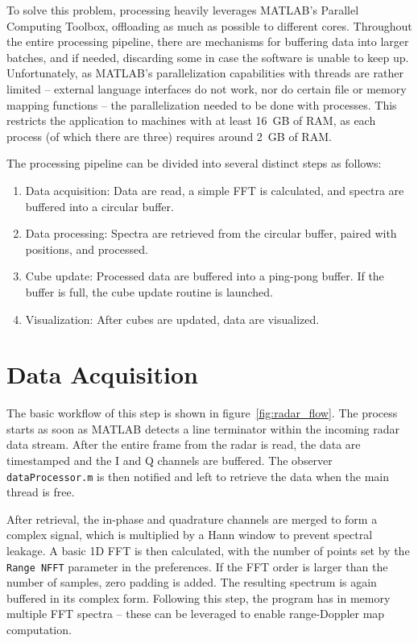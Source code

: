To solve this problem, processing heavily leverages MATLAB's Parallel Computing Toolbox, offloading as much as possible to different cores.
Throughout the entire processing pipeline, there are mechanisms for buffering data into larger batches, and if needed, discarding some in case the software is unable to keep up.
Unfortunately, as MATLAB's parallelization capabilities with threads are rather limited -- external language interfaces do not work, nor do certain file or memory mapping functions \cite{matlabParallel} -- the parallelization needed to be done with processes.
This restricts the application to machines with at least 16~GB of RAM, as each process (of which there are three) requires around 2~GB of RAM.

The processing pipeline can be divided into several distinct steps as follows:
\begin{enumerate}
  \item Data acquisition: Data are read, a simple FFT is calculated, and spectra are buffered into a circular buffer.
  \item Data processing: Spectra are retrieved from the circular buffer, paired with positions, and processed.
  \item Cube update: Processed data are buffered into a ping-pong buffer. If the buffer is full, the cube update routine is launched.
  \item Visualization: After cubes are updated, data are visualized.
\end{enumerate}

\section{Data Acquisition}

The basic workflow of this step is shown in figure~\ref{fig:radar_flow}.
The process starts as soon as MATLAB detects a line terminator within the incoming radar data stream.
After the entire frame from the radar is read, the data are timestamped and the I and Q channels are buffered.
The observer \texttt{dataProcessor.m} is then notified and left to retrieve the data when the main thread is free.

After retrieval, the in-phase and quadrature channels are merged to form a complex signal, which is multiplied by a Hann window to prevent spectral leakage.
A basic 1D FFT is then calculated, with the number of points set by the \texttt{Range NFFT} parameter in the preferences.
If the FFT order is larger than the number of samples, zero padding is added.
The resulting spectrum is again buffered in its complex form.
Following this step, the program has in memory multiple FFT spectra -- these can be leveraged to enable range-Doppler map computation.

